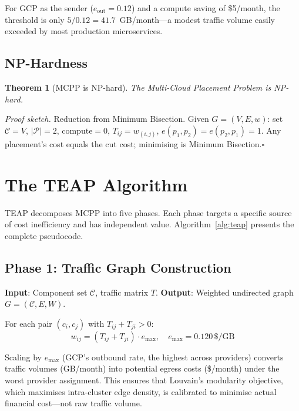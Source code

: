 \documentclass[sigconf,10pt]{acmart}
\newtheorem{theorem}{Theorem}
\begin{document}
For GCP as the sender ($e_{\text{out}} = 0.12$) and a compute saving of
\$5/month, the threshold is only $5/0.12 = 41.7$~GB/month---a modest traffic
volume easily exceeded by most production microservices.

\subsection{NP-Hardness}

\begin{theorem}[MCPP is NP-hard]\label{thm:nph}
The Multi-Cloud Placement Problem is NP-hard.
\end{theorem}

\textit{Proof sketch.}
Reduction from Minimum Bisection.
Given $G=(V,E,w)$: set $\mathcal{C}=V$, $|\mathcal{P}|=2$,
$\text{compute}=0$, $T_{ij}=w_{(i,j)}$, $e(p_1,p_2) = e(p_2,p_1) = 1$.
Any placement's cost equals the cut cost; minimising is Minimum Bisection.\hfill$\square$

\section{The TEAP Algorithm}\label{sec:teap}

TEAP decomposes MCPP into five phases.
Each phase targets a specific source of cost inefficiency and has independent value.
Algorithm~\ref{alg:teap} presents the complete pseudocode.

\subsection{Phase 1: Traffic Graph Construction}

\textbf{Input}: Component set $\mathcal{C}$, traffic matrix $T$.
\textbf{Output}: Weighted undirected graph $G = (\mathcal{C}, E, W)$.

For each pair $(c_i, c_j)$ with $T_{ij} + T_{ji} > 0$:
\begin{equation}
w_{ij} = (T_{ij} + T_{ji}) \cdot e_{\max}, \quad e_{\max} = 0.120\,\$/\text{GB}
\end{equation}

Scaling by $e_{\max}$ (GCP's outbound rate, the highest across providers) converts
traffic volumes (GB/month) into potential egress costs (\$/month) under the worst
provider assignment.
This ensures that Louvain's modularity objective, which maximises intra-cluster
edge density, is calibrated to minimise actual financial cost---not raw traffic volume.
\end{document}
